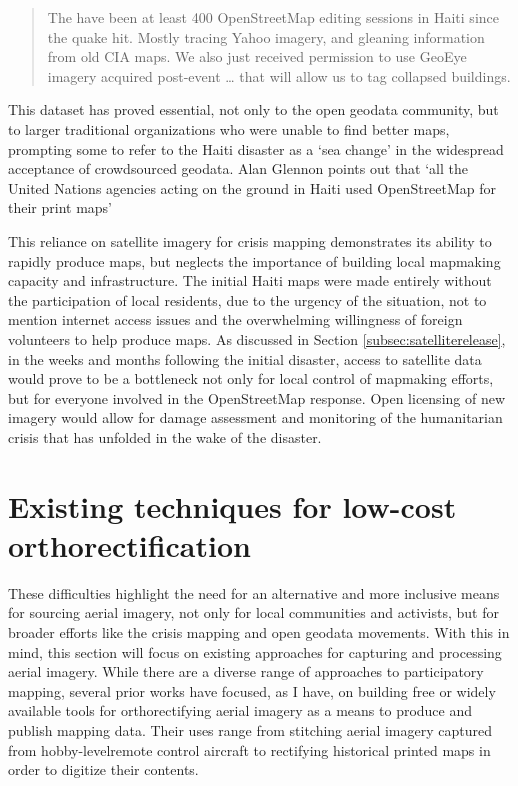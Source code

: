 \documentclass[11pt,oneside,notitlepage]{report}
\begin{document}
\begin{quote}The have been at least 400 OpenStreetMap editing sessions in Haiti since the quake hit. Mostly tracing Yahoo imagery, and gleaning information from old CIA maps. We also just received permission to use GeoEye imagery acquired post-event … that will allow us to tag collapsed buildings.\end{quote} \cite{maron2010haiti}

This dataset has proved essential, not only to the open geodata community, but to larger traditional organizations who were unable to find better maps, prompting some to refer to the Haiti disaster as a `sea change' in the widespread acceptance of crowdsourced geodata. Alan Glennon points out that `all the United Nations agencies acting on the ground in Haiti used OpenStreetMap for their print maps' \cite{glennon2010grassrootscrisis}

This reliance on satellite imagery for crisis mapping demonstrates its ability to rapidly produce maps, but neglects the importance of building local mapmaking capacity and infrastructure. The initial Haiti maps were made entirely without the participation of local residents, due to the urgency of the situation, not to mention internet access issues and the overwhelming willingness of foreign volunteers to help produce maps. As discussed in Section \ref{subsec:satelliterelease}, in the weeks and months following the initial disaster, access to satellite data would prove to be a bottleneck not only for local control of mapmaking efforts, but for everyone involved in the OpenStreetMap response. Open licensing of new imagery would allow for damage assessment and monitoring of the humanitarian crisis that has unfolded in the wake of the disaster.

\section{Existing techniques for low-cost orthorectification}
\label{sec:existingtechniques}

These difficulties highlight the need for an alternative and more inclusive means for sourcing aerial imagery, not only for local communities and activists, but for broader efforts like the crisis mapping and open geodata movements. With this in mind, this section will focus on existing approaches for capturing and processing aerial imagery. While there are a diverse range of approaches to participatory mapping, several prior works have focused, as I have, on building free or widely available tools for orthorectifying aerial imagery as a means to produce and publish mapping data. Their uses range from stitching aerial imagery captured from hobby-levelremote control aircraft to rectifying historical printed maps in order to digitize their contents.
\end{document}
